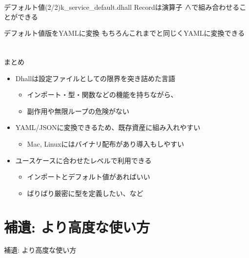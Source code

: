 \documentclass[unicode,12pt]{beamer}
\begin{document}
\begin{frame}{デフォルト値(2/2)}{\ttfamily k\_service\_default.dhall}
  Recordは演算子 {\ttfamily ∧}で組み合わせることができる
  
\end{frame}

\begin{frame}{デフォルト値版をYAMLに変換}
  もちろんこれまでと同じくYAMLに変換できる
  
\end{frame}

\section{}

\begin{frame}[plain]{まとめ}
  \begin{itemize}
  \item Dhallは\alert{設定ファイルとしての限界}を突き詰めた言語
    \begin{itemize}
    \item インポート・型・関数などの機能を持ちながら、
    \item 副作用や無限ループの危険がない
    \end{itemize}
  \item \alert{YAML/JSONに変換できる}ため、既存資産に組み入れやすい
    \begin{itemize}
    \item Mac, Linuxにはバイナリ配布があり導入もしやすい
    \end{itemize}
  \item \alert{ユースケースに合わせたレベル}で利用できる
    \begin{itemize}
    \item インポートとデフォルト値があればいい
    \item ばりばり厳密に型を定義したい、など
    \end{itemize}
  \end{itemize}
\end{frame}

\section{補遺: より高度な使い方}

\begin{frame}{補遺: より高度な使い方}

\end{frame}
\end{document}
